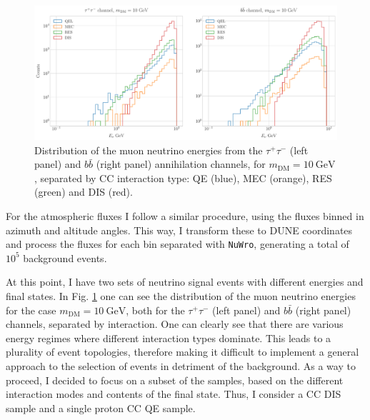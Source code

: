 \begin{figure}[t]
	\centering
	\includegraphics[width=1\linewidth]{Images/DM_Analysis/solardm_nu_mu_interactions.pdf}
	\caption[Distribution of the muon neutrino energies from the $\tau^{+} \tau^{-}$ and $b\bar{b}$ annihilation channels.]{Distribution of the muon neutrino energies from the $\tau^{+} \tau^{-}$ (left panel) and $b\bar{b}$ (right panel) annihilation channels, for $m_{\mathrm{DM}} = 10 \ \mathrm{GeV}$, separated by CC interaction type: QE (blue), MEC (orange), RES (green) and DIS (red).}
	\label{fig:solardm_nu_mu_interactions}
\end{figure}

For the atmospheric fluxes I follow a similar procedure, using the fluxes binned in azimuth and altitude angles. This way, I transform these to DUNE coordinates and process the fluxes for each bin separated with \texttt{NuWro}, generating a total of $10^{5}$ background events.

At this point, I have two sets of neutrino signal events with different energies and final states. In Fig. \ref{fig:solardm_nu_mu_interactions} one can see the distribution of the muon neutrino energies for the case $m_{\mathrm{DM}} = 10 \ \mathrm{GeV}$, both for the $\tau^{+} \tau^{-}$ (left panel) and $b\bar{b}$ (right panel) channels, separated by interaction. One can clearly see that there are various energy regimes where different interaction types dominate. This leads to a plurality of event topologies, therefore making it difficult to implement a general approach to the selection of events in detriment of the background. As a way to proceed, I decided to focus on a subset of the samples, based on the different interaction modes and contents of the final state. Thus, I consider a CC DIS sample and a single proton CC QE sample.

